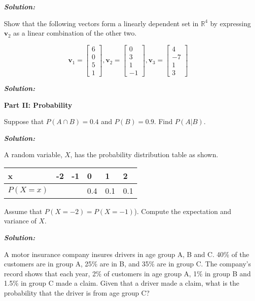 \documentclass[addpoints,12pt]{exam}
\begin{document}
\begin{questions}
\textbf{\textit{{\color{coral} Solution:}}}

\question Show that the following vectors form a linearly dependent set in $\mathbb{R}^4$ by expressing $\bm{v}_2$ as a linear combination of the other two.

\[\bm{v}_1=\begin{bmatrix}6\\0\\5\\1\end{bmatrix},\bm{v}_2=\begin{bmatrix}0\\3\\1\\-1\end{bmatrix},\bm{v}_3=\begin{bmatrix}4\\-7\\1\\3\end{bmatrix}\]

\textbf{\textit{{\color{coral} Solution:}}}



\hspace{-0.25in}\noindent\textbf{{\large Part II: Probability}}

\question Suppose that $P (A \cap B) = 0.4$ and $P(B)= 0.9$. Find $P(A|B)$.

\textbf{\textit{{\color{coral} Solution:}}}


\question A random variable, $X$, has the probability distribution table as shown.

\begin{table}[h]
\begin{tabular}{|l|l|l|l|l|l|}
\hline
\textit{}  x & -2 & -1 & 0 & 1 & 2 \\ \hline
         $P(X=x)$ &  &  & 0.4 & 0.1 & 0.1 \\ \hline
\end{tabular}
\end{table}

Assume that $P(X=-2)=P(X=-1)$). Compute the expectation and variance of $X$. 

\textbf{\textit{{\color{coral} Solution:}}}

\question A motor insurance company insures drivers in age group A, B and C. 40\% of the customers are in group A, 25\% are in B, and 35\% are in group C.  The company’s record shows that each year, 2\% of customers in age group A, 1\% in group B and 1.5\% in group C made a claim. Given that a driver made a claim, what is the probability that the driver is from age group C?


\end{questions}
\end{document}
